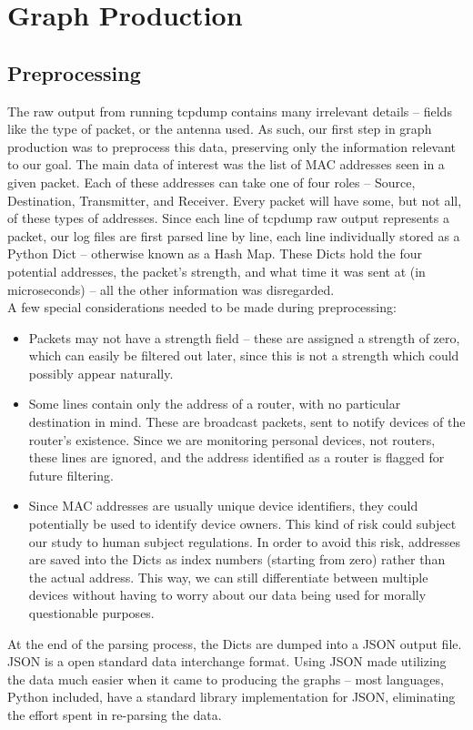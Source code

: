 \documentclass[letterpaper,abstract=on,titlepage=false]{scrreprt}
\begin{document}
	\section*{Graph Production}

		\subsection*{Preprocessing}

	The raw output from running tcpdump contains many irrelevant details -- fields like the type of packet, or the antenna used.
	As such, our first step in graph production was to preprocess this data, preserving only the information relevant to our goal.
    The main data of interest was the list of MAC addresses seen in a given packet.
    Each of these addresses can take one of four roles -- Source, Destination, Transmitter, and Receiver.
    Every packet will have some, but not all, of these types of addresses.
    Since each line of tcpdump raw output represents a packet, our log files are first parsed line by line, each line individually stored as a Python Dict -- otherwise known as a Hash Map.
    These Dicts hold the four potential addresses, the packet's strength, and what time it was sent at (in microseconds) -- all the other information was disregarded.\\
    A few special considerations needed to be made during preprocessing:
    \begin{itemize}
    \item Packets may not have a strength field -- these are assigned a strength of zero, which can easily be filtered out later, since this is not a strength which could possibly appear naturally.
    \item Some lines contain only the address of a router, with no particular destination in mind.
    These are broadcast packets, sent to notify devices of the router's existence.
    Since we are monitoring personal devices, not routers, these lines are ignored, and the address identified as a router is flagged for future filtering.
    \item Since MAC addresses are usually unique device identifiers, they could potentially be used to identify device owners.
      This kind of risk could subject our study to human subject regulations.
      In order to avoid this risk, addresses are saved into the Dicts as index numbers (starting from zero) rather than the actual address.
      This way, we can still differentiate between multiple devices without having to worry about our data being used for morally questionable purposes.
    \end{itemize}
    At the end of the parsing process, the Dicts are dumped into a JSON output file.
    JSON is a open standard data interchange format.
    Using JSON made utilizing the data much easier when it came to producing the graphs -- most languages, Python included, have a standard library implementation for JSON, eliminating the effort spent in re-parsing the data.
\end{document}
